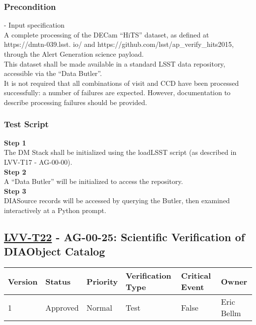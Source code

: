 \subsubsection{Precondition}\label{precondition-4}

- Input specification\\[2\baselineskip]A complete processing of the
DECam ``HiTS'' dataset, as defined at https://dmtn-039.lsst. io/ and
https://github.com/lsst/ap\_verify\_hits2015, through the Alert
Generation science payload.\\
This dataset shall be made available in a standard LSST data repository,
accessible via the ``Data Butler''.\\
It is not required that all combinations of visit and CCD have been
processed successfully: a number of failures are expected. However,
documentation to describe processing failures should be provided.

\subsubsection{Test Script}\label{test-script-4}

\textbf{Step 1}\\
The DM Stack shall be initialized using the loadLSST script (as
described in LVV-T17 - AG-00-00).\\[2\baselineskip]\textbf{Step 2}\\
A ``Data Butler'' will be initialized to access the
repository.\\[2\baselineskip]\textbf{Step 3}\\
DIASource records will be accessed by querying the Butler, then examined
interactively at a Python prompt.\\[2\baselineskip]

\hypertarget{lvv-t22---ag-00-25-scientific-verification-of-diaobject-catalog}{\subsection{\texorpdfstring{\href{https://jira.lsstcorp.org/secure/Tests.jspa\#/testCase/LVV-T22}{LVV-T22}
- AG-00-25: Scientific Verification of DIAObject
Catalog}{LVV-T22 - AG-00-25: Scientific Verification of DIAObject Catalog}}\label{lvv-t22---ag-00-25-scientific-verification-of-diaobject-catalog}}

\begin{longtable}[]{@{}llllll@{}}
\toprule
Version & Status & Priority & Verification Type & Critical Event &
Owner\tabularnewline
\midrule
\endhead
1 & Approved & Normal & Test & False & Eric Bellm\tabularnewline
\bottomrule
\end{longtable}

